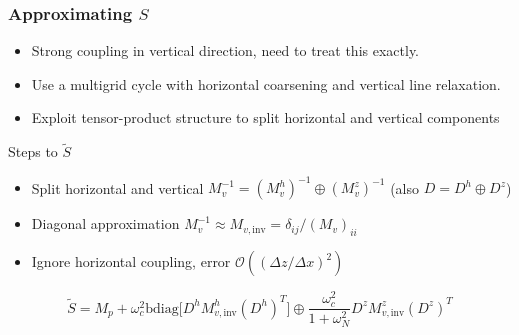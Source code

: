 \documentclass[presentation]{beamer}
\begin{document}
\begin{frame}[allowframebreaks]
  \frametitle{Approximating $S$}
  \begin{itemize}
  \item Strong coupling in vertical direction, need to treat this
    exactly.  
  \item Use a multigrid cycle with horizontal coarsening and
    vertical line relaxation.
  \item Exploit tensor-product structure to split horizontal and
    vertical components
  \end{itemize}
\framebreak

\begin{block}{Steps to $\tilde{S}$}
  \begin{itemize}
  \item Split horizontal and vertical $M_v^{-1} =
    (M_v^h)^{-1}\oplus (M_v^z)^{-1}$ (also $D
      = D^h \oplus D^z$)
  \item Diagonal approximation $M_v^{-1} \approx M_{v,\text{inv}} = \delta_{ij} / (M_v)_{ii}$
  \item Ignore horizontal coupling, error $\mathcal{O}((\Delta z/
    \Delta x)^2)$
  \end{itemize}
\end{block}
\begin{equation*}
  \tilde{S} = M_p + \omega_c^2 \text{bdiag}\big[D^h M_{v,\text{inv}}^h
  (D^h)^T\big] \oplus \frac{\omega_c^2}{1 + \omega_N^2} D^z
    M_{v,\text{inv}}^z (D^z)^T
\end{equation*}
\end{frame}
\end{document}
